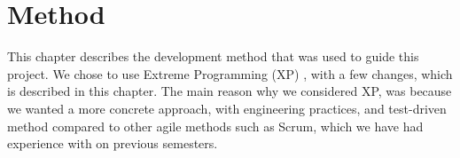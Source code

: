 
\chapter{Method}
\label{cha:method}

This chapter describes the development method that was used to guide this project. We chose to use Extreme Programming (XP) \parencite{xp}, with a few changes, which is described in this chapter. The main reason why we considered XP, was because we wanted a more concrete approach, with engineering practices, and test-driven method compared to other agile methods such as Scrum, which we have had experience with on previous semesters.




